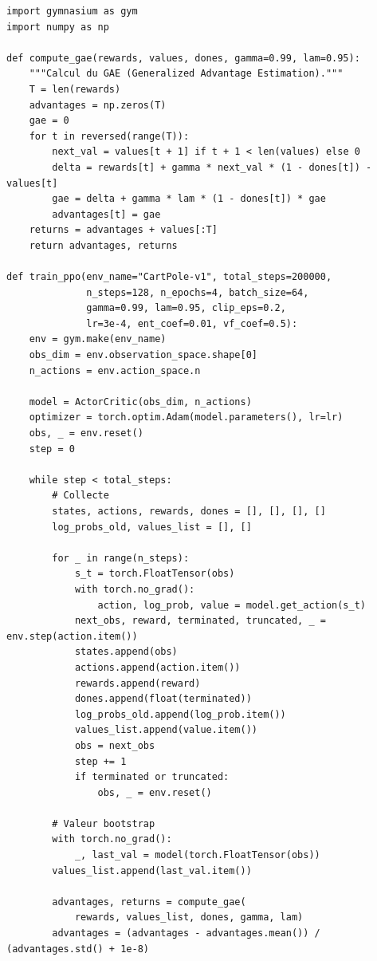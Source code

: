 \begin{codeblock}[title=\textbf{PPO --- Boucle d'entra\^inement}]
\begin{verbatim}
import gymnasium as gym
import numpy as np

def compute_gae(rewards, values, dones, gamma=0.99, lam=0.95):
    """Calcul du GAE (Generalized Advantage Estimation)."""
    T = len(rewards)
    advantages = np.zeros(T)
    gae = 0
    for t in reversed(range(T)):
        next_val = values[t + 1] if t + 1 < len(values) else 0
        delta = rewards[t] + gamma * next_val * (1 - dones[t]) - values[t]
        gae = delta + gamma * lam * (1 - dones[t]) * gae
        advantages[t] = gae
    returns = advantages + values[:T]
    return advantages, returns

def train_ppo(env_name="CartPole-v1", total_steps=200000,
              n_steps=128, n_epochs=4, batch_size=64,
              gamma=0.99, lam=0.95, clip_eps=0.2,
              lr=3e-4, ent_coef=0.01, vf_coef=0.5):
    env = gym.make(env_name)
    obs_dim = env.observation_space.shape[0]
    n_actions = env.action_space.n

    model = ActorCritic(obs_dim, n_actions)
    optimizer = torch.optim.Adam(model.parameters(), lr=lr)
    obs, _ = env.reset()
    step = 0

    while step < total_steps:
        # Collecte
        states, actions, rewards, dones = [], [], [], []
        log_probs_old, values_list = [], []

        for _ in range(n_steps):
            s_t = torch.FloatTensor(obs)
            with torch.no_grad():
                action, log_prob, value = model.get_action(s_t)
            next_obs, reward, terminated, truncated, _ = env.step(action.item())
            states.append(obs)
            actions.append(action.item())
            rewards.append(reward)
            dones.append(float(terminated))
            log_probs_old.append(log_prob.item())
            values_list.append(value.item())
            obs = next_obs
            step += 1
            if terminated or truncated:
                obs, _ = env.reset()

        # Valeur bootstrap
        with torch.no_grad():
            _, last_val = model(torch.FloatTensor(obs))
        values_list.append(last_val.item())

        advantages, returns = compute_gae(
            rewards, values_list, dones, gamma, lam)
        advantages = (advantages - advantages.mean()) / (advantages.std() + 1e-8)


\end{verbatim}
\end{codeblock}
